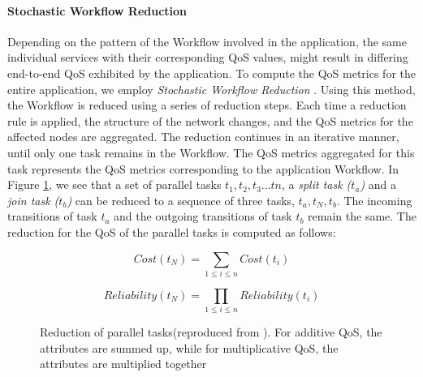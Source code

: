 \documentclass[10pt,journal,compsoc]{IEEEtran}
\begin{document}
\paragraph{Stochastic Workflow Reduction\label{swr}}
Depending on the pattern of the Workflow involved in the application, the same individual services with their corresponding QoS values, might result in differing end-to-end QoS exhibited by the application. To compute the QoS metrics for the entire application, we employ \textit{Stochastic Workflow Reduction} \cite{Cardoso2002Workflow}. Using this method, the Workflow is reduced using a series of reduction steps. Each time a reduction rule is applied, the structure of the network changes, and the QoS metrics for the affected nodes are aggregated. The reduction continues in an iterative manner, until only one task remains in the Workflow. The QoS metrics aggregated for this task represents the QoS metrics corresponding to the application Workflow. In Figure \ref{fig:parallel_reduction}, we see that a set of parallel tasks $t_{1}, t_{2}, t_{3}...t{n}$, a \textit{split task ($t_{a}$)} and a \textit{join task ($t_{b}$)} can be reduced to a sequence of three tasks, $t_{a}, t_{N}, t_{b}$. The incoming transitions of task $t_{a}$ and the outgoing transitions of task $t_{b}$ remain the same. The reduction for the QoS of the parallel tasks is computed as follows:

\begin{equation}
Cost(t_{N}) = \sum_{1 \leq i \leq n} Cost(t_{i})
\end{equation}

\begin{equation}
Reliability(t_{N}) = \prod_{1 \leq i \leq n} Reliability(t_{i})
\end{equation}

\begin{figure}[h]
	\centering
	\caption{Reduction of parallel tasks(reproduced from \cite{Cardoso2004Quality}). For additive QoS, the attributes are summed up, while for multiplicative QoS, the attributes are multiplied together\label{fig:parallel_reduction}}
\end{figure}
\end{document}
